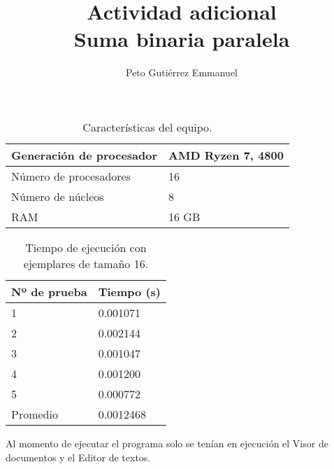 \documentclass{article}
\title{Actividad adicional\\Suma binaria paralela}
\author{Peto Gutiérrez Emmanuel}
\begin{document}
\maketitle

\begin{table}[htb]
\begin{center}
\begin{tabular}{|l|l|}
\hline
Generación de procesador & AMD Ryzen 7, 4800 \\ \hline
Número de procesadores & 16 \\ \hline
Número de núcleos & 8 \\ \hline
RAM & 16 GB \\ \hline
\end{tabular}
\caption{Características del equipo.}
\end{center}
\label{tabla:1}
\end{table}


\begin{table}[htb]
\begin{center}
\begin{tabular}{|l|l|}
\hline
Nº de prueba & Tiempo (s) \\ \hline
1 & 0.001071 \\ \hline
2 & 0.002144 \\ \hline
3 & 0.001047 \\ \hline
4 & 0.001200 \\ \hline
5 & 0.000772 \\ \hline
Promedio & 0.0012468 \\ \hline
\end{tabular}
\caption{Tiempo de ejecución con ejemplares de tamaño 16.}
\end{center}
\label{tabla:2}
\end{table}

Al momento de ejecutar el programa solo se tenían en ejecución el Visor de documentos y el Editor de textos.
\end{document}
